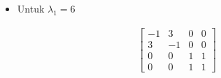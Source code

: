 \documentclass[12pt, a4paper]{scrartcl}
\begin{document}
\begin{enumerate}
\begin{enumerate}
                \begin{itemize}
                    \item[] Untuk $\lambda_1 = 6$
                \end{itemize}

                \begin{align*}
                    \begin{bmatrix}
                        -1 & 3 & 0 & 0
                        \\ 3 & -1 & 0 & 0
                        \\ 0 & 0 & 1 & 1
                        \\ 0 & 0 & 1 & 1
                    \end{bmatrix}
                \end{align*}


\end{enumerate}
\end{enumerate}
\end{document}
